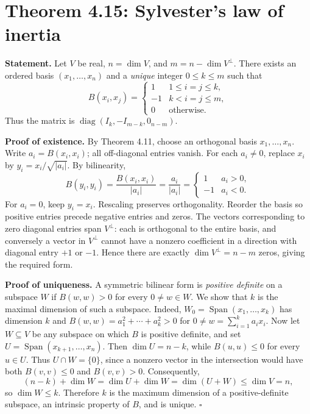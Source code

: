\documentclass[11pt,a4paper]{article}
\begin{document}
\section{Theorem 4.15: Sylvester's law of inertia}
\textbf{Statement.} Let \(V\) be real, \(n=\dim V\), and \(m=n-\dim V^\perp\).
There exists an ordered basis \((x_1,\ldots,x_n)\) and a \emph{unique}
integer \(0\leq k\leq m\) such that
\[
B(x_i,x_j)=
\begin{cases}
1 & 1\leq i=j\leq k,\\
-1 & k<i=j\leq m,\\
0 & \text{otherwise}.
\end{cases}
\]
Thus the matrix is \(\operatorname{diag}(I_k,-I_{m-k},0_{n-m})\).

\textbf{Proof of existence.}
By Theorem 4.11, choose an orthogonal basis \(x_1,\ldots,x_n\).
Write \(a_i=B(x_i,x_i)\); all off-diagonal entries vanish.
For each \(a_i\neq0\), replace \(x_i\) by \(y_i=x_i/\sqrt{|a_i|}\).
By bilinearity,
\[
B(y_i,y_i)=\frac{B(x_i,x_i)}{|a_i|}
=\frac{a_i}{|a_i|}=
\begin{cases}1&a_i>0,\\-1&a_i<0.\end{cases}
\]
For \(a_i=0\), keep \(y_i=x_i\). Rescaling preserves orthogonality.
Reorder the basis so positive entries precede negative entries and zeros.
The vectors corresponding to zero diagonal entries span \(V^\perp\):
each is orthogonal to the entire basis, and conversely a vector in
\(V^\perp\) cannot have a nonzero coefficient in a direction with
diagonal entry \(+1\) or \(-1\). Hence there are exactly
\(\dim V^\perp=n-m\) zeros, giving the required form.

\textbf{Proof of uniqueness.}
A symmetric bilinear form is \emph{positive definite} on a subspace
\(W\) if \(B(w,w)>0\) for every \(0\neq w\in W\).
We show that \(k\) is the maximal dimension of such a subspace.
Indeed, \(W_0=\operatorname{Span}(x_1,\ldots,x_k)\) has dimension \(k\)
and \(B(w,w)=a_1^2+\cdots+a_k^2>0\) for
\(0\neq w=\sum_{i=1}^k a_ix_i\).
Now let \(W\subseteq V\) be any subspace on which \(B\) is positive definite,
and set \(U=\operatorname{Span}(x_{k+1},\ldots,x_n)\).
Then \(\dim U=n-k\), while \(B(u,u)\leq0\) for every \(u\in U\).
Thus \(U\cap W=\{0\}\), since a nonzero vector in the intersection
would have both \(B(v,v)\leq0\) and \(B(v,v)>0\).
Consequently,
\[
(n-k)+\dim W=\dim U+\dim W
=\dim(U+W)\leq\dim V=n,
\]
so \(\dim W\leq k\).
Therefore \(k\) is the maximum dimension of a positive-definite
subspace, an intrinsic property of \(B\), and is unique. \(\square\)
\end{document}
